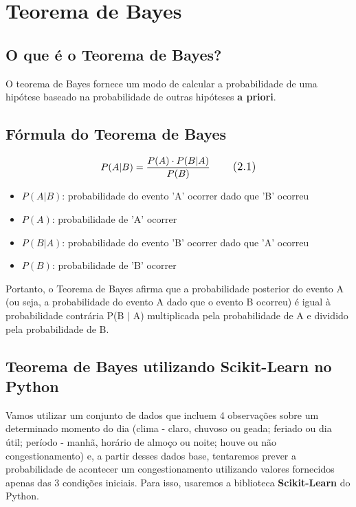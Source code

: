 \section{Teorema de Bayes}

\subsection{O que é o Teorema de Bayes?}

O teorema de Bayes fornece um modo de calcular a probabilidade de uma hipótese baseado na probabilidade de outras hipóteses \textbf{a priori}.

\subsection{Fórmula do Teorema de Bayes}

\begin{equation}
\large P(A|B) = \frac{P(A) \cdot P(B|A)}{P(B)}
\tag{2.1}
\end{equation}
	
\begin{itemize}
\item $P(A|B)$: probabilidade do evento 'A' ocorrer dado que 'B' ocorreu
\item $P(A)$: probabilidade de 'A' ocorrer
\item $P(B|A)$: probabilidade do evento 'B' ocorrer dado que 'A' ocorreu
\item $P(B)$: probabilidade de 'B' ocorrer
\end{itemize}

Portanto, o Teorema de Bayes afirma que a probabilidade posterior do evento A (ou seja, a probabilidade do evento A dado que o evento B ocorreu) é igual à probabilidade contrária P(B \(|\) A) multiplicada pela probabilidade de A e dividido pela probabilidade de B.

\subsection{Teorema de Bayes utilizando Scikit-Learn no Python}

Vamos utilizar um conjunto de dados que incluem 4 observações sobre um determinado momento do dia (clima - claro, chuvoso ou geada; feriado ou dia útil; período - manhã, horário de almoço ou noite; houve ou não congestionamento) e, a partir desses dados base, tentaremos prever a probabilidade de acontecer um congestionamento utilizando valores fornecidos apenas das 3 condições iniciais. Para isso, usaremos a biblioteca \textbf{Scikit-Learn} do Python.

